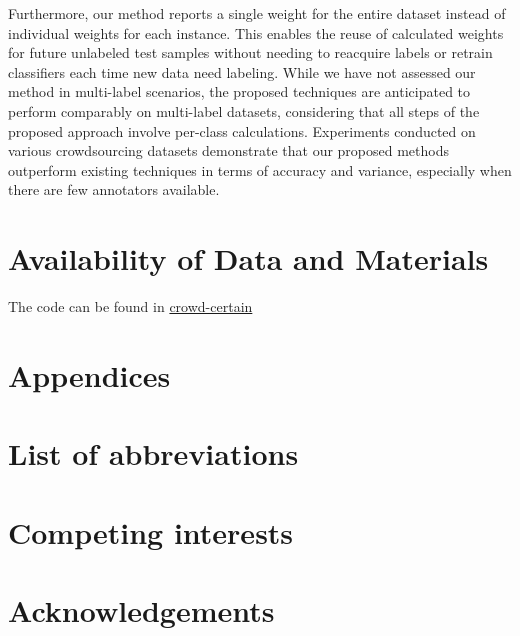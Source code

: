 Furthermore, our method reports a single weight for the entire dataset instead of individual weights for each instance. This enables the reuse of calculated weights for future unlabeled test samples without needing to reacquire labels or retrain classifiers each time new data need labeling. While we have not assessed our method in multi-label scenarios, the proposed techniques are anticipated to perform comparably on multi-label datasets, considering that all steps of the proposed approach involve per-class calculations. Experiments conducted on various crowdsourcing datasets demonstrate that our proposed methods outperform existing techniques in terms of accuracy and variance, especially when there are few annotators available.

\section{Availability of Data and Materials}
The code can be found in \href{https://github.com/artinmajdi/crowdcertain}{crowd-certain}

\section{Appendices}
\section*{List of abbreviations}
\section*{Competing interests}
\section*{Acknowledgements}
